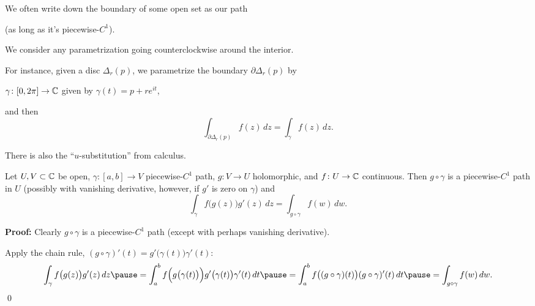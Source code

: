 \documentclass[10pt,aspectratio=169]{beamer}
\begin{document}
\begin{frame}
We often write down the
boundary of some open set as our path

(as long as it's piecewise-$C^1$).

\medskip
\pause

We consider any parametrization going counterclockwise around the interior.

\medskip
\pause

For instance, given a disc $\Delta_r(p)$, we parametrize
the boundary $\partial \Delta_r(p)$ by

$\gamma  \colon [0,2\pi] \to {\mathbb{C}}$ given by $\gamma(t) = p + re^{it}$,

\medskip
\pause

and then 
\begin{equation*}
\int_{\partial \Delta_r(p)} f(z) \, dz
=
\int_{\gamma} f(z) \, dz .
\end{equation*}
\end{frame}

\begin{frame}
There is also the ``$u$-substitution'' from calculus.
\pause

\begin{proposition}
Let $U,V \subset {\mathbb{C}}$ be open, $\gamma \colon [a,b] \to V$ 
piecewise-$C^1$ path, $g \colon V \to U$ holomorphic, and $f \colon U \to {\mathbb{C}}$
continuous.
\pause
Then $g \circ \gamma$ is a piecewise-$C^1$ path in $U$
(possibly with vanishing derivative, however, if $g'$ is zero on $\gamma$) and
\pause
\begin{equation*}
\int_{\gamma} f\bigl(g(z)\bigr) g'(z) \, dz
=
\int_{g \circ \gamma} f(w) \, dw .
\end{equation*}
\end{proposition}

\pause
\textbf{Proof:}
Clearly $g \circ \gamma$ is a piecewise-$C^1$ path (except with perhaps
vanishing derivative).

\medskip
\pause
Apply the chain rule,
$(g \circ \gamma)'(t) = g'\bigl(\gamma(t)\bigr) \gamma'(t)$:
\pause
\[
\int_{\gamma} f\bigl(g(z)\bigr) g'(z) \, dz
\pause
=
\int_a^b
f\Bigl(g\bigl(\gamma(t)\bigr)\Bigr) g'\bigl(\gamma(t)\bigr) \gamma'(t) \, dt
\pause
=
\int_a^b
f\bigl((g \circ \gamma)(t)\bigr) (g \circ \gamma)'(t) \, dt
\pause
=
\int_{g \circ \gamma} f(w) \, dw .
\]
\qed
\end{frame}
\end{document}
